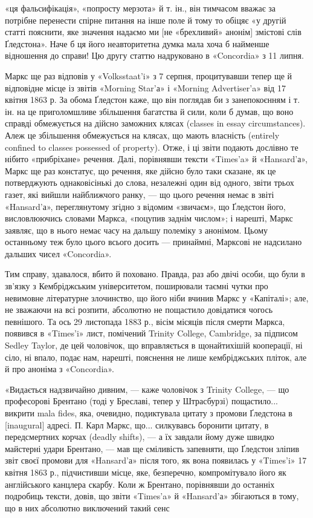 «ця фальсифікація», «попросту мерзота» й т. ін., він тимчасом
вважає за потрібне перенести спірне питання на інше поле й тому
то обіцяє «у другій статті пояснити, яке значення надаємо ми
[не «брехливий» анонім] змістові слів Ґледстона». Наче б ця
його неавторитетна думка мала хоча б найменше відношення до
справи! Цю другу статтю надруковано в «Concordia» з 11 липня.

Маркс ще раз відповів у «Volksstaat’i» з 7 серпня, процитувавши
тепер ще й відповідне місце із звітів «Morning Star’а» і
«Morning Advertiser’a» від 17 квітня 1863 р. За обома Ґледстон
каже, що він поглядав би з занепокоєнням і т. ін. на це приголомшливе
збільшення багатства й сили, коли б думав, що воно
справді обмежується на дійсно заможних клясах (classes in essay
circumstances). Алеж це збільшення обмежується на клясах,
що мають власність (entirely confined to classes possessed of
property). Отже, і ці звіти подають дослівно те нібито «прибріхане»
речення. Далі, порівнявши тексти «Times’a» й «Hansard’а»,
Маркс ще раз констатує, що речення, яке дійсно було
таки сказане, як це потверджують однаковісінькі до слова, незалежні
один від одного, звіти трьох газет, які вийшли найближчого
ранку, — що цього речення немає в звіті «Hansard’а», переглянутому
згідно з відомим «звичаєм», що Ґледстон його,
висловлюючись словами Маркса, «поцупив заднім числом»; і
нарешті, Маркс заявляє, що в нього немає часу на дальшу полеміку
з анонімом. Цьому останньому теж було цього всього досить —
принаймні, Марксові не надсилано дальших чисел «Concordia».

Тим справу, здавалося, вбито й поховано. Правда, раз або
двічі особи, що були в зв’язку з Кембріджським університетом,
поширювали таємні чутки про невимовне літературне злочинство,
що його ніби вчинив Маркс у «Капіталі»; але, не зважаючи на
всі розпити, абсолютно не пощастило довідатися чогось певнішого.
Та ось 29 листопада 1883 р., вісім місяців після смерти
Маркса, появився в «Times’i» лист, помічений Trinity College,
Cambridge, за підписом Sedley Taylor, де цей чоловічок, що вправляється
в щонайтихішій кооперації, ні сіло, ні впало, подає нам,
нарешті, пояснення не лише кембріджських пліток, але й про
аноніма з «Concordia».

«Видається надзвичайно дивним, — каже чоловічок з Trinity
College, — що професорові Брентано (тоді у Бреславі, тепер у
Штрасбурзі) пощастило... викрити mala fides, яка, очевидно,
подиктувала цитату з промови Ґледстона в [inaugural] адресі.
П. Карл Маркс, що... силкувавсь боронити цитату, в передсмертних
корчах (deadly shifts), — а їх завдали йому дуже швидко
майстерні удари Брентано, — мав ще сміливість запевняти, що
Ґледстон зліпив звіт своєї промови для «Hansard’а» після того,
як вона появилась у «Times’i» 17 квітня 1863 р., підчистивши
місце, яке, безперечно, компромітувало його як англійського
канцлера скарбу. Коли ж Брентано, порівнявши до останніх
подробиць тексти, довів, що звіти «Times’a» й «Hansard’а» збігаються
в тому, що в них абсолютно виключений такий сенс
